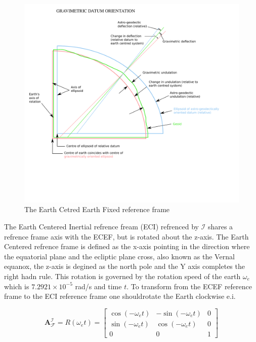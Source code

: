 \begin{figure}[H]
    \centering
    \includegraphics[width=\textwidth]{figures/modelling/GRAVIMETRIC_DATUM_ORIENTATION}
    \caption{The Earth Cetred Earth Fixed reference frame}
    \label{fig:3.4}
\end{figure}





The Earth Centered Inertial refrence fream (ECI) refrenced by $\mathcal{I}$ shares a refrence frame axis with the ECEF, but is rotated about the z-axis. The Earth
Centered refrence frame is defined as the x-axis pointing in the direction where the equatorial plane and the ecliptic plane cross, also known as the Vernal equanox, the
z-axis is degined as the north pole and the Y axis completes the right hadn rule. This rotation is governed by the rotation speed of the earth $\omega_e$ which 
is $7.2921\times10^{-5}$ rad/s and time $t$. To transform from the ECEF reference frame to the ECI reference frame one shouldrotate the Earth clockwise e.i. 

\begin{equation}
    \mathbf{A}_{\mathcal{F}}^{\mathcal{I}} = R(\omega_e t) = 
    \begin{bmatrix}
        \cos(-\omega_e t) & -\sin(-\omega_e t) & 0\\
        \sin(-\omega_e t) & \cos(-\omega_e t) & 0\\
        0 & 0 & 1
    \end{bmatrix}
\end{equation}

